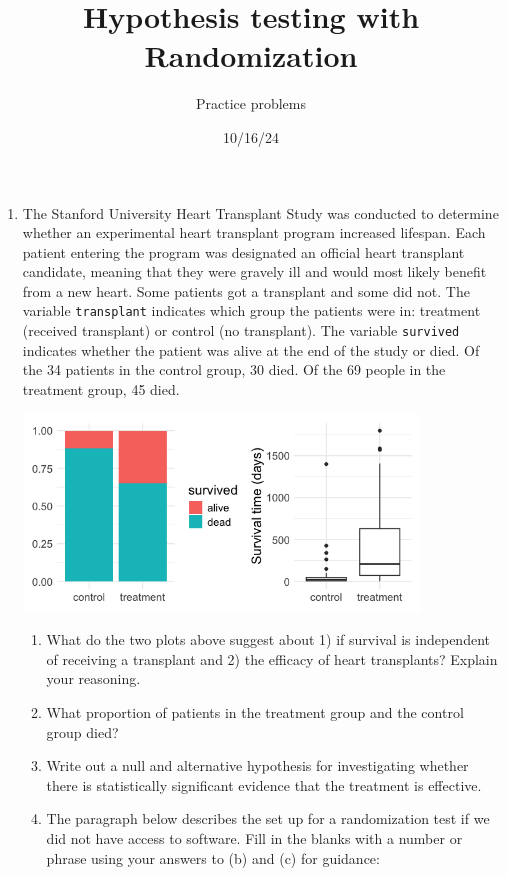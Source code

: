\documentclass[
  letterpaper,
  DIV=11,
  numbers=noendperiod]{scrartcl}
\title{Hypothesis testing with Randomization}
\author{Practice problems}
\date{10/16/24}
\begin{document}
\maketitle
\ifdefined\Shaded\renewenvironment{Shaded}{\begin{tcolorbox}[breakable, frame hidden, borderline west={3pt}{0pt}{shadecolor}, enhanced, interior hidden, sharp corners, boxrule=0pt]}{\end{tcolorbox}}\fi

\begin{enumerate}
\def\labelenumi{\arabic{enumi}.}
\item
  The Stanford University Heart Transplant Study was conducted to
  determine whether an experimental heart transplant program increased
  lifespan. Each patient entering the program was designated an official
  heart transplant candidate, meaning that they were gravely ill and
  would most likely benefit from a new heart. Some patients got a
  transplant and some did not. The variable \texttt{transplant}
  indicates which group the patients were in: treatment (received
  transplant) or control (no transplant). The variable \texttt{survived}
  indicates whether the patient was alive at the end of the study or
  died. Of the 34 patients in the control group, 30 died. Of the 69
  people in the treatment group, 45 died.

  \includegraphics[width=4.14583in,height=\textheight]{images/14-heart-transplant-eda.png}

  \begin{enumerate}
  \def\labelenumii{\alph{enumii}.}
  \item
    What do the two plots above suggest about 1) if survival is
    independent of receiving a transplant and 2) the efficacy of heart
    transplants? Explain your reasoning.
  \item
    What proportion of patients in the treatment group and the control
    group died?
  \item
    Write out a null and alternative hypothesis for investigating
    whether there is statistically significant evidence that the
    treatment is effective.
  \item
    The paragraph below describes the set up for a randomization test if
    we did not have access to software. Fill in the blanks with a number
    or phrase using your answers to (b) and (c) for guidance:


\end{enumerate}
\end{enumerate}
\end{document}
